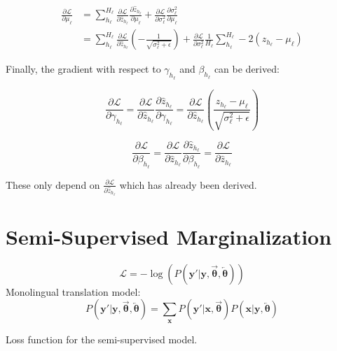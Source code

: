 \begin{equation}
\begin{aligned}
\frac{\partial \mathcal{L}}{\partial \mu_\ell} &= \sum_{h_\ell}^{H_\ell} \frac{\partial \mathcal{L}}{\partial \hat{z}_{h_\ell}} \frac{\partial \hat{z}_{h_\ell}}{\partial \mu_\ell} + \frac{\partial \mathcal{L}}{\partial \sigma_{\ell}^2} \frac{\partial \sigma_\ell^2}{\partial \mu_\ell} \\
&= \sum_{h_\ell}^{H_\ell} \frac{\partial \mathcal{L}}{\partial \hat{z}_{h_\ell}} \left(- \frac{1}{\sqrt{\sigma_\ell^2 + \epsilon}}\right) + \frac{\partial \mathcal{L}}{\partial \sigma_{\ell}^2} \frac{1}{H_\ell} \sum_{h_\ell}^{H_\ell} -2 \left(z_{h_\ell} - \mu_\ell\right)
\end{aligned}
\end{equation}

Finally, the gradient with respect to $\gamma_{h_\ell}$ and $\beta_{h_\ell}$ can be derived:

\begin{equation}
\frac{\partial \mathcal{L}}{\partial \gamma_{h_\ell}} = \frac{\partial \mathcal{L}}{\partial \hat{z}_{h_\ell}} \frac{\partial \hat{z}_{h_\ell}}{\partial \gamma_{h_\ell}} = \frac{\partial \mathcal{L}}{\partial \hat{z}_{h_\ell}} \left(\frac{z_{h_\ell} - \mu_\ell}{\sqrt{\sigma_\ell^2 + \epsilon}}\right)
\end{equation}

\begin{equation}
\frac{\partial \mathcal{L}}{\partial \beta_{h_\ell}} = \frac{\partial \mathcal{L}}{\partial \hat{z}_{h_\ell}} \frac{\partial \hat{z}_{h_\ell}}{\partial \beta_{h_\ell}} = \frac{\partial \mathcal{L}}{\partial \hat{z}_{h_\ell}}
\end{equation}

These only depend on $\frac{\partial \mathcal{L}}{\partial \hat{z}_{h_\ell}}$ which has already been derived.

\section{Semi-Supervised Marginalization}
\label{appendix:backward-pass:semi-sum}

\begin{equationbox}[H]
\begin{equation*}
\mathcal{L} = -\log(P(\mathbf{y}'|\mathbf{y}, \overrightarrow{\boldsymbol\theta}, \overleftarrow{\boldsymbol\theta}))
\end{equation*}
Monolingual translation model:
\begin{equation*}
P(\mathbf{y}'|\mathbf{y}, \overrightarrow{\boldsymbol\theta}, \overleftarrow{\boldsymbol\theta}) = \sum_{\mathbf{x}} P(\mathbf{y}'|\mathbf{x}, \overrightarrow{\boldsymbol\theta}) P(\mathbf{x}|\mathbf{y}, \overleftarrow{\boldsymbol\theta})
\end{equation*}
\caption{Loss function for the semi-supervised model.}
\end{equationbox}

